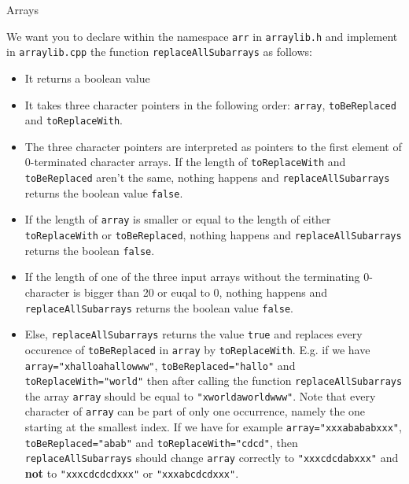 \documentclass[12pt,a4paper]{scrartcl}
\begin{document}
\begin{aufgabe}[13]{Arrays}
        \begin{teilaufgabe}[6]
            We want you to declare within the namespace \texttt{arr} in \texttt{arraylib.h} and implement in \texttt{arraylib.cpp} the function \texttt{replaceAllSubarrays} as follows:
            \begin{itemize}
                \item It returns a boolean value
                \item It takes three character pointers in the following order:  \texttt{array}, \texttt{toBeReplaced} and \texttt{toReplaceWith}.
                \item The three character pointers are interpreted as pointers to the first element of 0-terminated character arrays. If the length of \texttt{toReplaceWith} and \texttt{toBeReplaced} aren't the same, nothing happens and \texttt{replaceAllSubarrays} returns the boolean value \texttt{false}.
                \item If the length of \texttt{array} is smaller or equal to the length of either \texttt{toReplaceWith} or \texttt{toBeReplaced}, nothing happens and \texttt{replaceAllSubarrays} returns the boolean \texttt{false}.
                \item If the length of one of the three input arrays without the terminating 0-character is bigger than 20 or euqal to 0, nothing happens and \texttt{replaceAllSubarrays} returns the boolean value \texttt{false}.
                \item Else, \texttt{replaceAllSubarrays} returns the value \texttt{true} and replaces every occurence of \texttt{toBeReplaced} in \texttt{array} by \texttt{toReplaceWith}. E.g. if we have \texttt{array="xhalloahallowww"}, \texttt{toBeReplaced="hallo"} and \texttt{toReplaceWith="world"} then after calling the function \texttt{replaceAllSubarrays} the array \texttt{array} should be equal to \texttt{"xworldaworldwww"}. Note that every character of \texttt{array} can be part of only one occurrence, namely the one starting at the smallest index. If we have for example \texttt{array="xxxabababxxx"}, \texttt{toBeReplaced="abab"} and \texttt{toReplaceWith="cdcd"}, then \texttt{replaceAllSubarrays} should change \texttt{array} correctly to \texttt{"xxxcdcdabxxx"} and \textbf{not} to \texttt{"xxxcdcdcdxxx"} or \texttt{"xxxabcdcdxxx"}.
            \end{itemize}
        \end{teilaufgabe}


\end{aufgabe}
\end{document}
